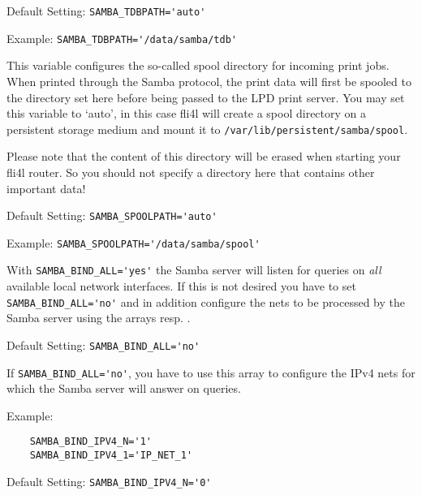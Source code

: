 \begin{description}
    Default Setting: \verb+SAMBA_TDBPATH='auto'+

    Example: \verb+SAMBA_TDBPATH='/data/samba/tdb'+


    This variable configures the so-called spool directory for
    incoming print jobs. When printed through the Samba protocol,
    the print data will first be spooled to the directory set here before
    being passed to the LPD print server. You may set this variable to
    `auto', in this case fli4l will create a spool directory on a persistent
    storage medium and mount it to \texttt{/var/lib/persistent/samba/spool}.

    Please note that the content of this directory will be erased when starting
    your fli4l router. So you should not specify a directory here that contains
    other important data!

    Default Setting: \verb+SAMBA_SPOOLPATH='auto'+

    Example: \verb+SAMBA_SPOOLPATH='/data/samba/spool'+


    With \verb+SAMBA_BIND_ALL='yes'+ the Samba server will listen for queries
    on \emph{all} available local network interfaces. If this is not desired
    you have to set \verb+SAMBA_BIND_ALL='no'+ and in addition configure
    the nets to be processed by the Samba server using the arrays 
    resp. .

    Default Setting: \verb+SAMBA_BIND_ALL='no'+


    If \verb+SAMBA_BIND_ALL='no'+, you have to use this array to configure the IPv4 nets
    for which the Samba server will answer on queries.

    Example:
\begin{example}
\begin{verbatim}
    SAMBA_BIND_IPV4_N='1'
    SAMBA_BIND_IPV4_1='IP_NET_1'
\end{verbatim}
\end{example}

    Default Setting: \verb+SAMBA_BIND_IPV4_N='0'+



\end{description}
